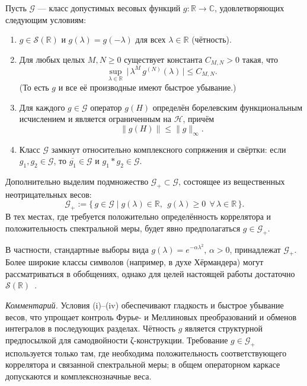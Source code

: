\documentclass{article}
\numberwithin{equation}{section}
\theoremstyle{plain}
\theoremstyle{definition}
\theoremstyle{remark}
\def\alpha{α}\def\beta{β}\def\gamma{γ}\def\Gamma{Γ}%
\def\infty{∞}\def\partial{∂}\def\sum{Σ}\def\int{∫}%
\begin{document}
\noindent
Пусть $\mathcal G$ — класс допустимых весовых функций $g:\mathbb R\to\mathbb C$,
удовлетворяющих следующим условиям:
\begin{enumerate}[label=(\roman*), leftmargin=2.2em]
  \item $g\in\mathcal S(\mathbb R)$ и $g(\lambda)=g(-\lambda)$ для всех $\lambda\in\mathbb R$ (чётность).
  
  \item Для любых целых $M,N\ge 0$ существует константа $C_{M,N}>0$ такая, что
  \begin{equation}
      \sup_{\lambda\in\mathbb R}\, \bigl|\,\lambda^{M}\, g^{(N)}(\lambda)\,\bigr|
      \le C_{M,N}.
  \end{equation}
  (То есть $g$ и все её производные имеют быстрое убывание.)

  \item Для каждого $g\in\mathcal G$ оператор $g(H)$ определён борелевским функциональным исчислением
  и является ограниченным на $\mathcal H$, причём
  \begin{equation}
      \|g(H)\|\le \|g\|_{\infty}.
  \end{equation}

  \item Класс $\mathcal G$ замкнут относительно комплексного сопряжения и свёртки:
  если $g_1,g_2\in\mathcal G$, то $\overline{g_1}\in\mathcal G$ и $g_1\ast g_2\in\mathcal G$.
\end{enumerate}

\noindent
Дополнительно выделим подмножество $\mathcal G_{+}\subset\mathcal G$,
состоящее из вещественных неотрицательных весов:
\begin{equation}
\mathcal G_{+}:=\{\,g\in\mathcal G \mid g(\lambda)\in\mathbb R,\ \ g(\lambda)\ge 0\ \ \forall\,\lambda\in\mathbb R\,\}.
\end{equation}
В тех местах, где требуется положительно определённость коррелятора и положительность спектральной меры,
будет явно предполагаться $g\in\mathcal G_{+}$.

\noindent
В частности, стандартные выборы вида $g(\lambda)=e^{-\alpha\lambda^{2}}$, $\alpha>0$, принадлежат $\mathcal G_{+}$.
Более широкие классы символов (например, в духе Хёрмандера) могут рассматриваться в обобщениях,
однако для целей настоящей работы достаточно $\mathcal S(\mathbb R)$~\cite{Hormander1983}.

\emph{Комментарий.}
Условия (i)–(iv) обеспечивают гладкость и быстрое убывание весов,
что упрощает контроль Фурье- и Меллиновых преобразований и обменов интегралов
в последующих разделах.
Чётность $g$ является структурной предпосылкой для самодвойности ζ-конструкции.
Требование $g\in\mathcal G_{+}$ используется только там, где необходима положительность
соответствующего коррелятора и связанной спектральной меры; в общем операторном каркасе
допускаются и комплекснозначные веса.
\end{document}
